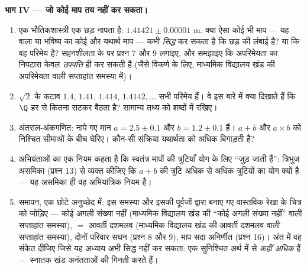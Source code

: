 \begin{problem}
\medskip
\noindent\textbf{भाग IV --- जो कोई माप तय नहीं कर सकता।}
\begin{enumerate}[resume]
  \item एक भौतिकशास्त्री एक छड़ नापता है: $1.41421 \pm 0.00001$ m. क्या ऐसा कोई भी माप
        --- यह वाला या भविष्य का कोई और यथार्थ माप --- कभी \emph{सिद्ध}
        कर सकता है कि छड़ की लंबाई  है? या कि वह परिमेय है?
        सहनशीलता के  पर प्रश्न 7 और 9 लगाइए, और समझाइए कि
        अपरिमेयता का निपटारा केवल \emph{उपपत्ति} ही कर सकती है (जैसे
        विकर्ण के लिए, माध्यमिक विद्यालय खंड की अपरिमेयता वाली सप्ताहांत
        समस्या में)।
  \item $\sqrt2$ के कटाव $1.4$, $1.41$, $1.414$, $1.4142,\dots$ सभी परिमेय हैं। वे इस
        बारे में क्या दिखाते हैं कि $\Q$ हर  से कितना
        सटकर बैठता है? सामान्य तथ्य को शब्दों में रखिए।
  \item अंतराल-अंकगणित: नापे गए मान $a = 2.5 \pm 0.1$ और $b = 1.2 \pm 0.1$ हैं। $a + b$ और $a \times b$
        को निश्चित सीमाओं के बीच घेरिए। कौन-सी संक्रिया यथार्थता को
        अधिक बिगाड़ती है?
  \item अभियंताओं का एक नियम कहता है कि स्वतंत्र मापों की त्रुटियाँ योग
        के लिए ``जुड़ जाती हैं'': त्रिभुज असमिका (प्रश्न 13) से व्यक्त
        कीजिए कि $a + b$ की त्रुटि अधिक से अधिक त्रुटियों का योग क्यों है
        --- यह असमिका ही वह अभियांत्रिक नियम है।
  \item समापन, एक छोटे अनुच्छेद में: इस समस्या और इसकी पूर्वजों द्वारा
        बनाए गए वास्तविक रेखा के चित्र को जोड़िए --- कोई अगली संख्या नहीं
        (माध्यमिक विद्यालय खंड की ``कोई अगली संख्या नहीं'' वाली सप्ताहांत
        समस्या),  $=$ आवर्ती दशमलव (माध्यमिक विद्यालय
        खंड की आवर्ती दशमलव वाली सप्ताहांत समस्या), दोनों परिवार सघन
        (प्रश्न 8 और 9), माप सदा अनिर्णीत (प्रश्न 16)। अंत में वह संकेत
        दीजिए जिसे यह अध्याय अभी सिद्ध नहीं कर सकता: एक सुनिश्चित अर्थ
        में   से \emph{कहीं अधिक} हैं ---
        स्नातक खंड अनंतताओं की गिनती करते हैं।
\end{enumerate}
\end{problem}
